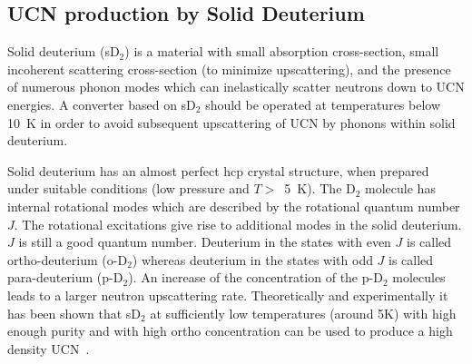 \subsection{UCN production by Solid Deuterium}
Solid deuterium (sD$_2$) is a material with small absorption
cross-section, small incoherent scattering cross-section (to minimize
upscattering), and the presence of numerous phonon modes which can
inelastically scatter neutrons down to UCN energies.
A converter based on sD$_2$ should be operated at temperatures below
10~K in order to avoid subsequent upscattering of UCN by phonons
within solid deuterium.
 
Solid deuterium has an almost perfect hcp crystal structure, when
prepared under suitable conditions (low pressure and $T >$~5~K). The
D$_2$ molecule has internal rotational modes which are described by
the rotational quantum number $J$. The rotational excitations give
rise to additional modes in the solid deuterium. %
$J$ is still a good quantum number.  Deuterium in the states with even
$J$ is called ortho-deuterium (o-D$_2$) whereas deuterium in the
states with odd $J$ is called para-deuterium (p-D$_2$). An increase of
the concentration of the p-D$_2$ molecules leads to a larger neutron
upscattering rate.
Theoretically and experimentally it has been shown that sD$_2$ at
sufficiently low temperatures (around 5K) with high enough purity and
with high ortho concentration can be used to produce a high density
UCN~\cite{Atchison2005}.






